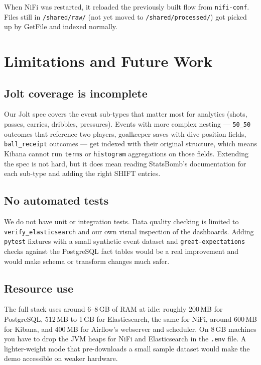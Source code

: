 \documentclass[conference]{IEEEtran}
\begin{document}
When NiFi was restarted, it reloaded the previously built flow from
\texttt{nifi-conf}. Files still in \texttt{/shared/raw/} (not yet moved to
\texttt{/shared/processed/}) got picked up by GetFile and indexed normally.


\section{Limitations and Future Work}

\subsection{Jolt coverage is incomplete}

Our Jolt spec covers the event sub-types that matter most for analytics
(shots, passes, carries, dribbles, pressures). Events with more complex
nesting — \texttt{50\_50} outcomes that reference two players, goalkeeper
saves with dive position fields, \texttt{ball\_receipt} outcomes — get indexed
with their original structure, which means Kibana cannot run \texttt{terms}
or \texttt{histogram} aggregations on those fields. Extending the spec is not
hard, but it does mean reading StatsBomb's documentation for each sub-type
and adding the right SHIFT entries.

\subsection{No automated tests}

We do not have unit or integration tests. Data quality checking is limited to
\texttt{verify\_elasticsearch} and our own visual inspection of the
dashboards. Adding \texttt{pytest} fixtures with a small synthetic event
dataset and \texttt{great-expectations} checks against the PostgreSQL fact
tables would be a real improvement and would make schema or transform changes
much safer.

\subsection{Resource use}

The full stack uses around 6--8\,GB of RAM at idle: roughly 200\,MB for
PostgreSQL, 512\,MB to 1\,GB for Elasticsearch, the same for NiFi, around
600\,MB for Kibana, and 400\,MB for Airflow's webserver and scheduler. On
8\,GB machines you have to drop the JVM heaps for NiFi and Elasticsearch in
the \texttt{.env} file. A lighter-weight mode that pre-downloads a small
sample dataset would make the demo accessible on weaker hardware.
\end{document}
